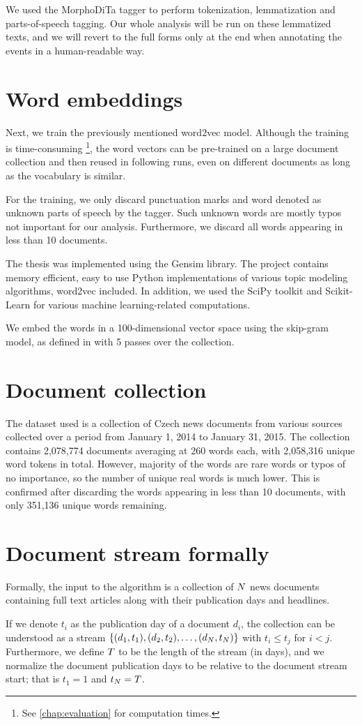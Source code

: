 We used the MorphoDiTa tagger \cite{morphodita} to perform tokenization, lemmatization and parts-of-speech tagging. Our whole analysis will be run on these lemmatized texts, and we will revert to the full forms only at the end when annotating the events in a human-readable way.


\section{Word embeddings} \label{word-embeddings}
Next, we train the previously mentioned word2vec model. Although the training is time-consuming \footnote{See \autoref{chap:evaluation} for computation times.}, the word vectors can be pre-trained on a large document collection and then reused in following runs, even on different documents as long as the vocabulary is similar.

For the training, we only discard punctuation marks and word denoted as unknown parts of speech by the tagger. Such unknown words are mostly typos not important for our analysis. Furthermore, we discard all words appearing in less than 10 documents.

The thesis was implemented using the Gensim \cite{gensim} library. The project contains memory efficient, easy to use Python implementations of various topic modeling algorithms, word2vec included. In addition, we used the SciPy toolkit \cite{scipy} and Scikit-Learn \cite{scikit-learn} for various machine learning-related computations.

We embed the words in a 100-dimensional vector space using the skip-gram model, as defined in \cite{word2vec} with 5 passes over the collection.


\section{Document collection}
The dataset used is a collection of Czech news documents from various sources collected over a period from January 1, 2014 to January 31, 2015. The collection contains 2,078,774 documents averaging at 260 words each, with 2,058,316 unique word tokens in total. However, majority of the words are rare words or typos of no importance, so the number of unique real words is much lower. This is confirmed after discarding the words appearing in less than 10 documents, with only 351,136 unique words remaining.


\section{Document stream formally}
Formally, the input to the algorithm is a collection of $N$ news documents containing full text articles along with their publication days and headlines.

If we denote $t_{i}$ as the publication day of a document $d_{i}$, the collection can be understood as a stream $\left\{ (d_{1}, t_{1}), (d_{2}, t_{2}), \dots, (d_{N}, t_{N}) \right\}$ with $t_{i} \leq t_{j}$ for $i < j$. Furthermore, we define $T$ to be the length of the stream (in days), and we normalize the document publication days to be relative to the document stream start; that is $t_{1} = 1$ and $t_{N} = T$.